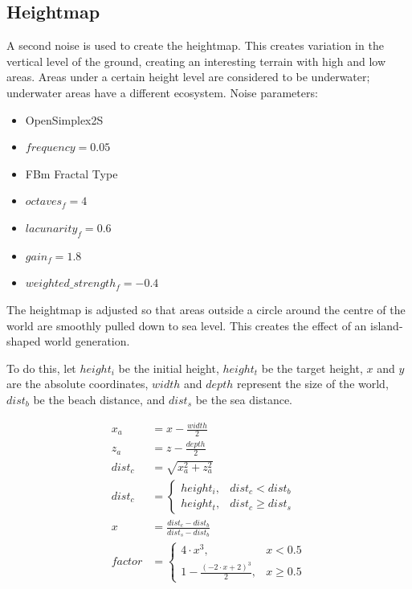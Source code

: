 \documentclass{article}
\begin{document}
\begin{multicols}{2}
        \subsection{Heightmap}
        
        A second noise is used to create the heightmap. This creates variation in the vertical level of the ground, creating an interesting terrain with high and low areas. Areas under a certain height level are considered to be underwater; underwater areas have a different ecosystem. Noise parameters:

        \begin{itemize}
            \setlength\itemsep{0.01em}
            \item OpenSimplex2S
            \item $frequency = 0.05$
            \item FBm Fractal Type
            \item $octaves_f = 4$
            \item $lacunarity_f = 0.6$
            \item $gain_f = 1.8$
            \item $weighted\_strength_f = -0.4$
        \end{itemize}
        
        The heightmap is adjusted so that areas outside a circle around the centre of the world are smoothly pulled down to sea level. This creates the effect of an island-shaped world generation.

        To do this, let $height_i$ be the initial height, $height_t$ be the target height, $x$ and $y$ are the absolute coordinates, $width$ and $depth$ represent the size of the world, $dist_b$ be the beach distance, and $dist_s$ be the sea distance.

        \[
            \begin{aligned}
                x_a &= x - \frac{width}{2} \\
                z_a &= z - \frac{depth}{2} \\
                dist_c &= \sqrt{x_a^2 + z_a^2} \\
                dist_c &= \begin{cases}
                    height_i, &dist_c < dist_b \\
                    height_t, &dist_c \ge dist_s
                \end{cases} \\
                x &= \frac{dist_c - dist_b}{dist_s - dist_b} \\
                factor &= \begin{cases}
                    4 \cdot x^3, &x < 0.5 \\
                    1 - \frac{(-2 \cdot x + 2)^3}{2}, &x \ge 0.5
                \end{cases}
            \end{aligned}
        \]


\end{multicols}
\end{document}
